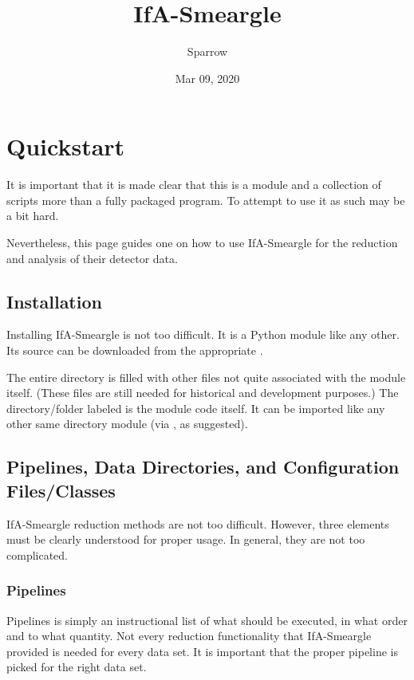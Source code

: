\documentclass[letterpaper,10pt,english]{sphinxmanual}
\title{IfA-Smeargle}
\date{Mar 09, 2020}
\author{Sparrow}
\begin{document}
\pagestyle{empty}
\sphinxmaketitle
\pagestyle{plain}
\sphinxtableofcontents
\pagestyle{normal}
\label{\detokenize{index::doc}}



\chapter{Quickstart}
\label{\detokenize{quickstart:quickstart}}\label{\detokenize{quickstart::doc}}
It is important that it is made clear that this is a module and a collection
of scripts more than a fully packaged program. To attempt to use it as such
may be a bit hard.

Nevertheless, this page guides one on how to use IfA-Smeargle for the
reduction and analysis of their detector data.


\section{Installation}
\label{\detokenize{quickstart:installation}}
Installing IfA-Smeargle is not too difficult. It is a Python module like any
other. Its source can be downloaded from the appropriate .

The entire directory is filled with other files not quite associated
with the module itself. (These files are still needed for historical and
development purposes.) The directory/folder labeled  is the
module code itself. It can be imported like any other same directory module
(via , as suggested).


\section{Pipelines, Data Directories, and Configuration Files/Classes}
\label{\detokenize{quickstart:pipelines-data-directories-and-configuration-files-classes}}
IfA-Smeargle reduction methods are not too difficult. However,
three elements must be clearly understood for proper usage. In general, they
are not too complicated.


\subsection{Pipelines}
\label{\detokenize{quickstart:pipelines}}
Pipelines is simply an instructional list of what should be executed, in
what order and to what quantity. Not every reduction functionality that
IfA-Smeargle provided is needed for every data set. It is important that
the proper pipeline is picked for the right data set.
\end{document}
